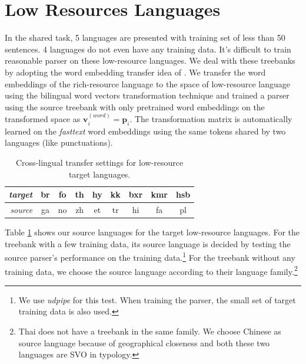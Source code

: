 \documentclass[11pt,a4paper]{article}
\begin{document}
%
%


%
%

\section{Low Resources Languages}\label{sec:low}

In the shared task, 5 languages are presented with training set of less than 50 sentences.
4 languages do not even have any training data.
It's difficult to train reasonable parser on these low-resource languages.
We deal with these treebanks by adopting the word embedding transfer idea 
of \citet{guo-EtAl:2015:ACL-IJCNLP2}.
We transfer the word embeddings of the rich-resource language
to the space of low-resource language using the bilingual word vectors transformation technique
\cite{DBLP:journals/corr/SmithTHH17}
and trained a parser using the source treebank
with only pretrained word embeddings on the transformed space
as $\mathbf{v}_i^{(word)} = \mathbf{p}_i$.
The transformation matrix is automatically learned on the \textit{fasttext} word embeddings
using the same tokens shared by two languages (like punctuations).

\begin{table}[t]
	\centering
	\small
	\begin{tabular}{r|cccccccc}
		\textit{target} & br & fo & th &hy & kk & bxr & kmr & hsb \\
		\hline
		\textit{source} & ga & no & zh & et & tr &  hi & fa & pl \\
	\end{tabular}
	\caption{Cross-lingual transfer settings for low-resource target languages.}\label{tbl:low-res-trans}
\end{table}
Table \ref{tbl:low-res-trans} shows our source languages for the target low-resource languages.
For the treebank with a few training data, its  source language is decided by
testing the source parser's performance on the training data.\footnote{We use \textit{udpipe} for this test.
	When training the parser, the small set of target training data is also used.}
For the treebank without any training data, we choose the source language according to their language family.\footnote{Thai
	does not have a treebank in the same family. We choose Chinese as source language because of geographical closeness
	and both these two languages are SVO in typology.}
\end{document}
